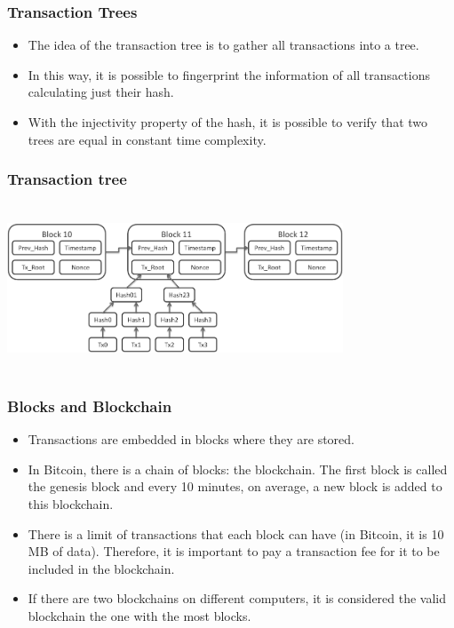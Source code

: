 \documentclass{beamer}
\begin{document}
\begin{frame}
   \frametitle{Transaction Trees}
   \begin{itemize}[<+->]
     \item The idea of the transaction tree is to gather all transactions into a tree.
     \item In this way, it is possible to fingerprint the information of all transactions calculating just their hash.
     \item With the injectivity property of the hash, it is possible to verify that two trees are equal in constant time complexity.
   \end{itemize}
\end{frame}

\begin{frame}
  \frametitle{Transaction tree}
    \includegraphics[width=10cm, height=5cm]{blockchain}
\end{frame}


\begin{frame}
   \frametitle{Blocks and Blockchain}
   \begin{itemize}[<+->]
     \item Transactions are embedded in blocks where they are stored.
     \item In Bitcoin, there is a chain of blocks: the blockchain.
       The first block is called the genesis block and every 10 minutes, on average, a new block is added to this blockchain.
     \item There is a limit of transactions that each block can have (in Bitcoin, it is 10 MB of data).
       Therefore, it is important to pay a transaction fee for it to be included in the blockchain.
     \item If there are two blockchains on different computers, it is considered the valid blockchain the one with the most blocks.
   \end{itemize}
\end{frame}
\end{document}
